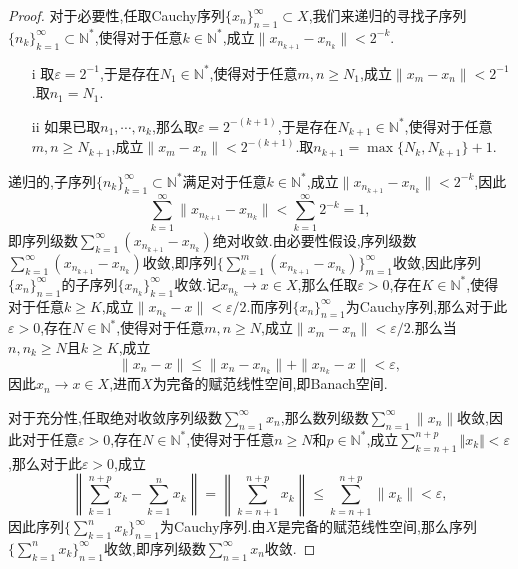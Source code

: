 \documentclass[lang = cn, scheme = chinese]{elegantbook}
\begin{document}
	\begin{proof}
		对于必要性,任取Cauchy序列$\{x_n\}_{n=1}^{\infty}\subset X$,我们来递归的寻找子序列$\{ n_k \}_{k=1}^{\infty}\subset\mathbb{N}^*$,使得对于任意$k\in\mathbb{N}^*$,成立$\| x_{n_{k+1}}-x_{n_k} \|<2^{-k}$.
		\begin{enumerate}
			\item[i]
			取$\varepsilon=2^{-1}$,于是存在$N_1\in\mathbb{N}^*$,使得对于任意$m,n\ge N_1$,成立$\|x_m-x_n\|<2^{-1}$.取$n_1=N_1$.
			\item[ii]
			如果已取$n_1,\cdots,n_k$,那么取$\varepsilon=2^{-(k+1)}$,于是存在$N_{k+1}\in\mathbb{N}^*$,使得对于任意$m,n\ge N_{k+1}$,成立$\|x_m-x_n\|<2^{-(k+1)}$.取$n_{k+1}=\max\{ N_{k},N_{k+1} \}+1$.
		\end{enumerate}
		
		递归的,子序列$\{ n_k \}_{k=1}^{\infty}\subset\mathbb{N}^*$满足对于任意$k\in\mathbb{N}^*$,成立$\| x_{n_{k+1}}-x_{n_k} \|<2^{-k}$,因此
		$$
		\sum_{k=1}^{\infty}\|x_{n_{k+1}}-x_{n_k}\|<\sum_{k=1}^{\infty}2^{-k}=1,
		$$
		即序列级数$\displaystyle\sum_{k=1}^{\infty}(x_{n_{k+1}}-x_{n_k})$绝对收敛.由必要性假设,序列级数$\displaystyle\sum_{k=1}^{\infty}(x_{n_{k+1}}-x_{n_k})$收敛,即序列$\displaystyle\{\sum_{k=1}^{m}(x_{n_{k+1}}-x_{n_k})\}_{m=1}^{\infty}$收敛,因此序列$\{x_n\}_{n=1}^{\infty}$的子序列$\{ x_{n_k} \}_{k=1}^{\infty}$收敛.记$x_{n_k}\to x\in X$,那么任取$\varepsilon>0$,存在$K\in\mathbb{N}^*$,使得对于任意$k\ge K$,成立$\| x_{n_k}-x\|<\varepsilon/2$.而序列$\{x_n\}_{n=1}^{\infty}$为Cauchy序列,那么对于此$\varepsilon>0$,存在$N\in\mathbb{N}^*$,使得对于任意$m,n\ge N$,成立$\|x_m-x_n\|<\varepsilon/2$.那么当$n,n_k\ge N$且$k\ge K$,成立
		$$
		\| x_n-x \|\le \|x_n-x_{n_k}\|+\|x_{n_k}-x\|<\varepsilon,
		$$因此$x_n\to x\in X$,进而$ X$为完备的赋范线性空间,即Banach空间.
		
		对于充分性,任取绝对收敛序列级数$\displaystyle\sum_{n=1}^{\infty}x_n$,那么数列级数$\displaystyle\sum_{n=1}^{\infty}\|x_n\|$收敛,因此对于任意$\varepsilon>0$,存在$N\in\mathbb{N}^*$,使得对于任意$n\ge N$和$p\in\mathbb{N}^*$,成立$\displaystyle\sum_{k=n+1}^{n+p} \Vert x_k \Vert<\varepsilon$,那么对于此$\varepsilon>0$,成立
		$$
		\left\|\sum_{k=1}^{n+p}x_k-\sum_{k=1}^{n}x_k\right\|
		=\left\|\sum_{k=n+1}^{n+p}x_k\right\|
		\le\sum_{k=n+1}^{n+p} \| x_k \|<\varepsilon,
		$$
		因此序列$\displaystyle\{\sum_{k=1}^{n}x_k\}_{n=1}^{\infty}$为Cauchy序列.由$X$是完备的赋范线性空间,那么序列$\displaystyle\{\sum_{k=1}^{n}x_k\}_{n=1}^{\infty}$收敛,即序列级数$\displaystyle\sum_{n=1}^{\infty}x_n$收敛.
	\end{proof}
	
\end{document}
